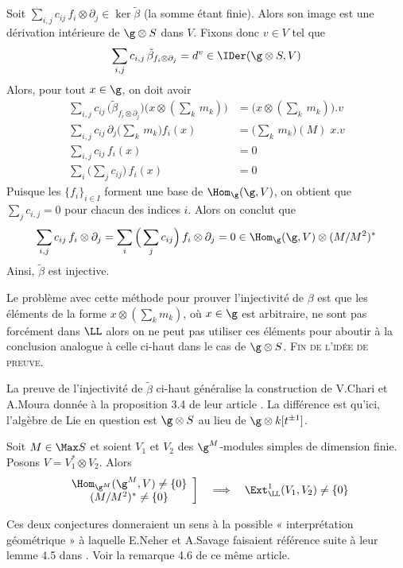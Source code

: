 \begin{annexeConj}
Soit $\sum_{i,j} c_{ij} \, f_i \otimes \partial_j \in \ker \tilde{\beta}$ (la somme étant finie). Alors son image est une dérivation intérieure de $\g \otimes S$ dans $V$. Fixons donc $v \in V$ tel que 
$$ \sum_{i,j} c_{i,j} \, \tilde{\beta}_{f_i \otimes \partial_j} = d^v \in \IDer(\g \otimes S,V)$$ 
Alors, pour tout $x \in \g$, on doit avoir
\begin{align*}
\sum_{i,j} c_{ij} \, \Big(\tilde{\beta}_{f_i \otimes \partial_j}\Big)\big(x \otimes (\textstyle{\sum_k}\, m_k)\big) &= \big(x \otimes (\textstyle{\sum_k}\, m_k)\big).v \\
\sum_{i,j} c_{ij} \, \partial_j\big(\textstyle{\sum_k}\, m_k\big) f_i(x) &= \big(\textstyle{\sum_k}\, m_k\big)(M) \; x.v \\
\sum_{i,j} c_{ij} \, f_i(x) &= 0 \\
\sum_i \Big(\sum_j c_{ij}\Big) \, f_i(x) &= 0
\end{align*}
Puisque les $\{f_i\}_{i \in I}$ forment une base de $\Hom_\g(\g,V)$, on obtient que $\sum_j c_{i,j} = 0$ pour chacun des indices $i$. Alors on conclut que
$$ \sum_{i,j} c_{ij} \, f_i \otimes \partial_j = \sum_i \Big(\sum_j c_{ij}\Big) \, f_i \otimes \partial_j = 0 \in \Hom_\g(\g,V) \otimes (M/M^2)^*$$
Ainsi, $\tilde{\beta}$ est injective. 

Le problème avec cette méthode pour prouver l'injectivité de $\beta$ est que les éléments de la forme $x \otimes (\sum_k m_k)$, où $x \in \g$ est arbitraire, ne sont pas forcément dans $\LL$ alors on ne peut pas utiliser ces éléments pour aboutir à la conclusion analogue à celle ci-haut dans le cas de $\g \otimes S$. \flushright \textsc{Fin de l'idée de preuve.}
\end{annexeConj}

\begin{annexeRem} La preuve de l'injectivité de $\tilde{\beta}$ ci-haut généralise la construction de V.Chari et A.Moura donnée à la proposition 3.4 de leur article \cite{CMspec}. La différence est qu'ici, l'algèbre de Lie en question est $\g \otimes S$ au lieu de $\g \otimes k[t^{\pm 1}]$.
\end{annexeRem}


\begin{annexeConj} Soit $M \in \Max S$ et soient $V_1$ et $V_2$ des $\g^M$-modules simples de dimension finie. Posons $V = V_1^* \otimes V_2$. Alors
$$ \left.\begin{array}{c} \Hom_{\g^M}(\g^M,V) \neq \{0\} \\ (M/M^2)^* \neq \{0\}\end{array}\right] \quad \Longrightarrow \quad \Ext^1_\LL(V_1,V_2) \neq \{0\} $$
\end{annexeConj}

\begin{annexeRem} Ces deux conjectures donneraient un sens à la possible « interprétation géométrique » à laquelle E.Neher et A.Savage faisaient référence suite à leur lemme 4.5 dans \cite{NSext}. Voir la remarque 4.6 de ce même article.
\end{annexeRem}
